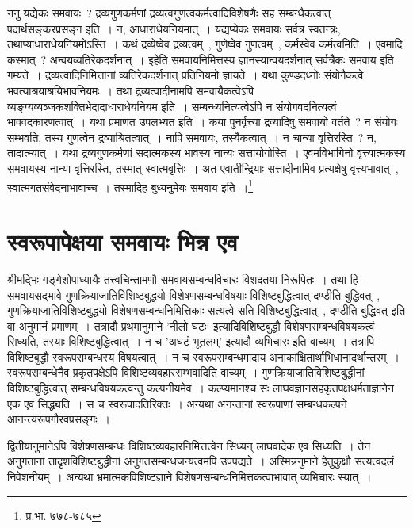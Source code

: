 	{\fontsize{11.7}{0}\selectfont\s ननु यद्येकः समवायः~? द्रव्यगुणकर्मणां द्रव्यत्वगुणत्वकर्मत्वादिविशेषणैः सह सम्बन्धैकत्वात् पदार्थसङ्करप्रसङ्ग इति~। न, आधाराधेयनियमात्~। यद्यप्येकः समवायः सर्वत्र स्वतन्त्रः, तथाप्याधाराधेयनियमोऽस्ति~। कथं द्रव्येष्वेव द्रव्यत्वम्~, गुणेष्वेव गुणत्वम्~, कर्मस्वेव कर्मत्वमिति~। एवमादि कस्मात्~? अन्वयव्यतिरेकदर्शनात्~। इहेति समवायनिमित्तस्य ज्ञानस्यान्वयदर्शनात् सर्वत्रैकः समवाय इति गम्यते~। द्रव्यत्वादिनिमित्तानां व्यतिरेकदर्शनात् प्रतिनियमो ज्ञायते~। यथा कुण्डदध्नोः संयोगैकत्वे भवत्याश्रयाश्रयिभावनियमः~। तथा द्रव्यत्वादीनामपि समवायैकत्वेऽपि व्यङ्ग्यव्यञ्जकशक्तिभेदादाधाराधेयनियम इति~। सम्बन्ध्यनित्यत्वेऽपि न संयोगवदनित्यत्वं भाववदकारणत्वात्~। यथा प्रमाणत उपलभ्यत इति~। कया पुनर्वृत्त्या द्रव्यादिषु समवायो वर्तते~? न संयोगः सम्भवति, तस्य गुणत्वेन द्रव्याश्रितत्वात्~। नापि समवायः, तस्यैकत्वात्~। न चान्या वृत्तिरस्ति~? न, तादात्म्यात्~। यथा द्रव्यगुणकर्मणां सदात्मकस्य भावस्य नान्यः सत्तायोगोस्ति~। एवमविभागिनो वृत्त्यात्मकस्य समवायस्य नान्या वृत्तिरस्ति, तस्मात् स्वात्मवृत्तिः~। अत एवातीन्द्रियाः सत्तादीनामिव प्रत्यक्षेषु वृत्त्यभावात्~, स्वात्मगतसंवेदनाभावाच्च~। तस्मादिह बुध्यनुमेयः समवाय इति~।\footnote{प्र.भा. ७७८-७८५}}

	\section{स्वरूपापेक्षया समवायः भिन्न एव} 

	श्रीमद्भिः गङ्गेशोपाध्यायैः तत्त्वचिन्तामणौ समवायसम्बन्धविचारः विशदतया निरूपितः~। तथा हि~- समवायसद्भावे  गुणक्रियाजातिविशिष्टबुद्धयो विशेषणसम्बन्धविषयाः विशिष्टबुद्धित्वात् दण्डीति बुद्धिवत्~, गुणक्रियाजातिविशिष्टबुद्धयो विशेषणसम्बन्धनिमित्तिकाः सत्यत्वे सति विशिष्टबुद्धित्वात्~, दण्डीति बुद्धिवत् इति वा अनुमानं  प्रमाणम्~। तत्रादौ प्रथमानुमाने 'नीलो घटः' इत्यादिविशिष्टबुद्धौ विशेषणसम्बन्धविषयकत्वं सिध्यति, तस्याः विशिष्टबुद्धित्वात्~। न च 'अघटं भूतलम्' इत्यादौ व्यभिचारः इति वाच्यम्~। तत्रापि विशिष्टबुद्धौ स्वरूपसम्बन्धस्य विषयत्वात्~। न च स्वरूपसम्बन्धमादाय अनाकांक्षितार्थाभिधानादर्थान्तरम्~। स्वरूपसम्बन्धेनैव प्रकृतपक्षेऽपि विशिष्टव्यवहारसम्भवादिति वाच्यम्~। गुणक्रियाजातिविशिष्टबुद्धीनां विशिष्टबुद्धित्वात् सम्बन्धविषयकत्वन्तु कल्पनीयमेव~। कल्प्यमानश्च सः लाघवज्ञानसहकृतपक्षधर्मताज्ञानेन एक एव सिद्ध्यति~। स च स्वरूपादतिरिक्तः~। अन्यथा अनन्तानां स्वरूपाणां सम्बन्धकल्पने आनन्त्यरूपगौरवप्रसङ्गः~।

	द्वितीयानुमानेऽपि विशेषणसम्बन्धः विशिष्टव्यवहारनिमित्तत्वेन सिध्यन् लाघवादेक एव सिध्यति~। तेन अनुगतानां तादृशविशिष्टबुद्धीनां अनुगतसम्बन्धजन्यत्वमपि उपपद्यते~। अस्मिन्ननुमाने हेतुकुक्षौ सत्यत्वदलं निवेशनीयम्~। अन्यथा भ्रमात्मकविशिष्टज्ञाने विशेषणसम्बन्धनिमित्तकत्वाभावात् व्यभिचारः स्यात्~। 


